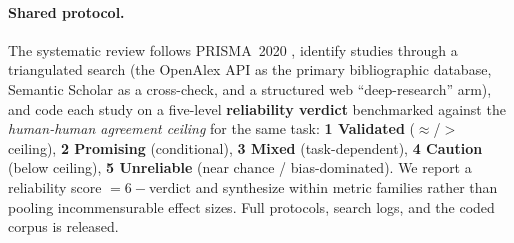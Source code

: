 \paragraph{Shared protocol.} The systematic review follows PRISMA~2020 \citep{page2021prisma}, identify studies through a
triangulated search (the OpenAlex API as the primary bibliographic database, Semantic Scholar as a cross-check, and
a structured web ``deep-research'' arm), and code each study on a five-level \textbf{reliability verdict}
benchmarked against the \emph{human-human agreement ceiling} for the same task: \textbf{1 Validated}
($\approx$/$>$ ceiling), \textbf{2 Promising} (conditional), \textbf{3 Mixed} (task-dependent), \textbf{4 Caution}
(below ceiling), \textbf{5 Unreliable} (near chance / bias-dominated). We report a reliability score $=6-$verdict
and synthesize within metric families rather than pooling incommensurable effect sizes. Full protocols, search
logs, and the coded corpus is released.

